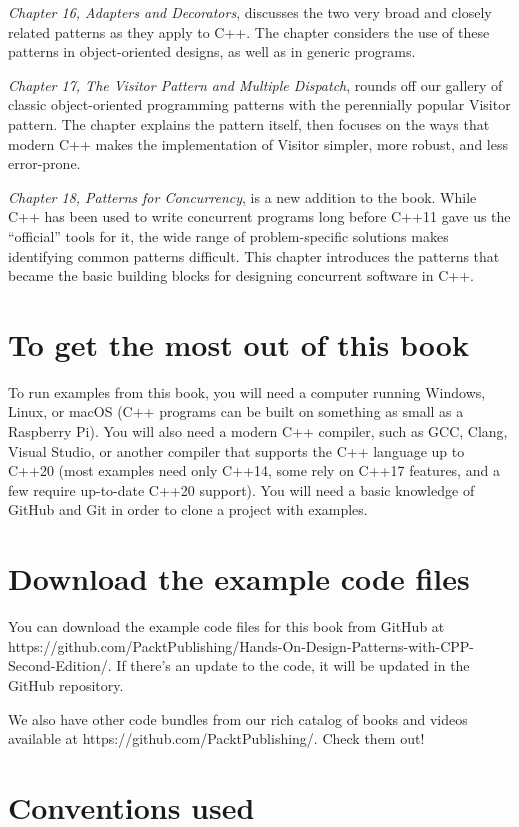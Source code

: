 \emph{Chapter 16, Adapters and Decorators}, discusses the two very broad and closely related patterns as they apply to C++. The chapter considers the use of these patterns in object-oriented designs, as well as in generic programs.

\emph{Chapter 17, The Visitor Pattern and Multiple Dispatch}, rounds off our gallery of classic object-oriented programming patterns with the perennially popular Visitor pattern. The chapter explains the pattern itself, then focuses on the ways that modern C++ makes the implementation of Visitor simpler, more robust, and less error-prone.

\emph{Chapter 18, Patterns for Concurrency}, is a new addition to the book. While C++ has been used to write concurrent programs long before C++11 gave us the ``official'' tools for it, the wide range of problem-specific solutions makes identifying common patterns difficult. This chapter introduces the patterns that became the basic building blocks for designing concurrent software in C++.

\section{To get the most out of this book}

To run examples from this book, you will need a computer running Windows, Linux, or macOS (C++ programs can be built on something as small as a Raspberry Pi). You will also need a modern C++ compiler, such as GCC, Clang, Visual Studio, or another compiler that supports the C++ language up to C++20 (most examples need only C++14, some rely on C++17 features, and a few require up-to-date C++20 support). You will need a basic knowledge of GitHub and Git in order to clone a project with examples.

\section{Download the example code files}

You can download the example code files for this book from GitHub at https://github.com/PacktPublishing/Hands-On-Design-Patterns-with-CPP-Second-Edition/. If there's an update to the code, it will be updated in the GitHub repository.

We also have other code bundles from our rich catalog of books and videos available at https://github.com/PacktPublishing/. Check them out!

\section{Conventions used}

